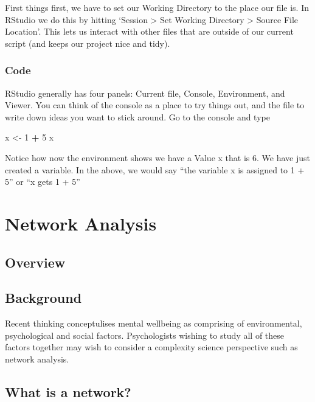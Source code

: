 \documentclass[]{book}
\newenvironment{Shaded}{\begin{snugshade}}{\end{snugshade}}
\newcommand{\DecValTok}[1]{\textcolor[rgb]{0.00,0.00,0.81}{#1}}
\newcommand{\StringTok}[1]{\textcolor[rgb]{0.31,0.60,0.02}{#1}}
\newcommand{\OperatorTok}[1]{\textcolor[rgb]{0.81,0.36,0.00}{\textbf{#1}}}
\newcommand{\NormalTok}[1]{#1}
\begin{document}
First things first, we have to set our Working Directory to the place
our file is. In RStudio we do this by hitting `Session \textgreater{}
Set Working Directory \textgreater{} Source File Location'. This lets us
interact with other files that are outside of our current script (and
keeps our project nice and tidy).

\subsection{Code}\label{code}

RStudio generally has four panels: Current file, Console, Environment,
and Viewer. You can think of the console as a place to try things out,
and the file to write down ideas you want to stick around. Go to the
console and type

\begin{Shaded}
\begin{Highlighting}[]
\NormalTok{x <-}\StringTok{ }\DecValTok{1} \OperatorTok{+}\StringTok{ }\DecValTok{5}
\NormalTok{x}
\end{Highlighting}
\end{Shaded}

Notice how now the environment shows we have a Value x that is 6. We
have just created a variable. In the above, we would say ``the variable
x is assigned to 1 + 5'' or ``x gets 1 + 5''

\chapter{Network Analysis}\label{network-analysis}

\section{Overview}\label{overview-3}

\section{Background}\label{background}

Recent thinking conceptulises mental wellbeing as comprising of
environmental, psychological and social factors. Psychologists wishing
to study all of these factors together may wish to consider a complexity
science perspective such as network analysis.

\section{What is a network?}\label{what-is-a-network}
\end{document}
